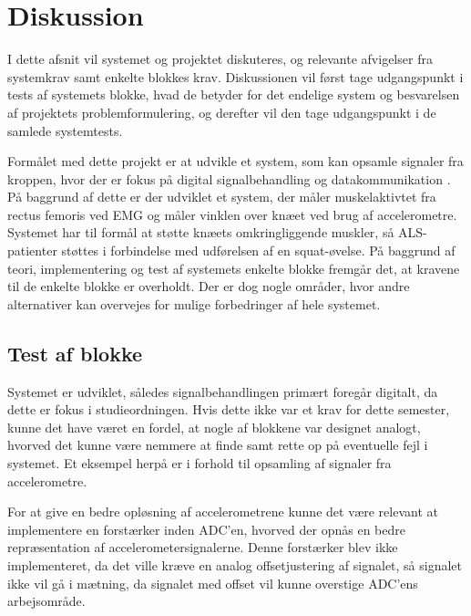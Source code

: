 \section{Diskussion} \label{sec:diskussion}
I dette afsnit vil systemet og projektet diskuteres, og relevante afvigelser fra systemkrav samt enkelte blokkes krav. Diskussionen vil først tage udgangspunkt i tests af systemets blokke, hvad de betyder for det endelige system og besvarelsen af projektets problemformulering, og derefter vil den tage udgangspunkt i de samlede systemtests. 

Formålet med dette projekt er at udvikle et system, som kan opsamle signaler fra kroppen, hvor der er fokus på digital signalbehandling og datakommunikation \citep{aalborguniversitet2014}. På baggrund af dette er der udviklet et system, der måler muskelaktivtet fra rectus femoris ved EMG og måler vinklen over knæet ved brug af accelerometre. Systemet har til formål at støtte knæets omkringliggende muskler, så ALS-patienter støttes i forbindelse med udførelsen af en squat-øvelse. På baggrund af teori, implementering og test af systemets enkelte blokke fremgår det, at kravene til de enkelte blokke er overholdt. Der er dog nogle områder, hvor andre alternativer kan overvejes for mulige forbedringer af hele systemet. 

\subsection{Test af blokke}
Systemet er udviklet, således signalbehandlingen primært foregår digitalt, da dette er fokus i studieordningen. Hvis dette ikke var et krav for dette semester, kunne det have været en fordel, at nogle af blokkene var designet analogt, hvorved det kunne være nemmere at finde samt rette op på eventuelle fejl i systemet. Et eksempel herpå er i forhold til opsamling af signaler fra accelerometre. 

For at give en bedre opløsning af accelerometrene kunne det være relevant at implementere en forstærker inden ADC'en, hvorved der opnås en bedre repræsentation af accelerometersignalerne. Denne forstærker blev ikke implementeret, da det ville kræve en analog offsetjustering af signalet, så signalet ikke vil gå i mætning, da signalet med offset vil kunne overstige ADC'ens arbejsområde. %

